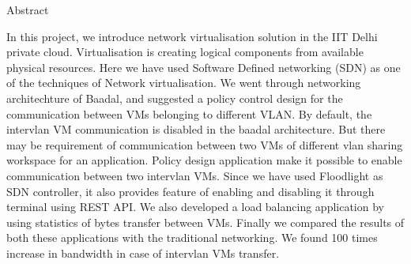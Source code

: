 \begin{center}
\LARGE{Abstract}
\end{center}

\vspace{0.5in}

In this project, we introduce network virtualisation solution in the IIT Delhi private cloud. Virtualisation is creating logical components from available physical resources. Here we have used Software Defined networking (SDN) as one of the techniques of Network virtualisation. We went through networking architechture of Baadal, and suggested a policy control design for the communication between VMs belonging to different VLAN. By default, the intervlan VM communication is disabled in the baadal architecture. But there may be requirement of communication between two VMs of different vlan sharing workspace for an application. Policy design application make it possible to enable communication between two intervlan VMs. Since we have used Floodlight as SDN controller, it also provides feature of enabling and disabling it through terminal using REST API. We also developed a load balancing application by using statistics of bytes transfer between VMs. Finally we compared the results of both these applications with the traditional networking. We found 100 times increase in bandwidth in case of intervlan VMs transfer. 
